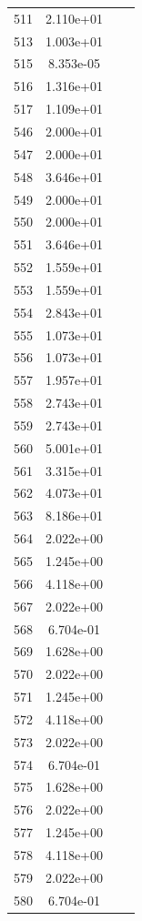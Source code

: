 \documentclass[12pt]{article}
\begin{document}
\begin{longtable}{@{}cccc@{}}
511 & 2.110e+01 &  &  \\
513 & 1.003e+01 &  &  \\
515 & 8.353e-05 &  &  \\
516 & 1.316e+01 &  &  \\
517 & 1.109e+01 &  &  \\
546 & 2.000e+01 &  &  \\
547 & 2.000e+01 &  &  \\
548 & 3.646e+01 &  &  \\
549 & 2.000e+01 &  &  \\
550 & 2.000e+01 &  &  \\
551 & 3.646e+01 &  &  \\
552 & 1.559e+01 &  &  \\
553 & 1.559e+01 &  &  \\
554 & 2.843e+01 &  &  \\
555 & 1.073e+01 &  &  \\
556 & 1.073e+01 &  &  \\
557 & 1.957e+01 &  &  \\
558 & 2.743e+01 &  &  \\
559 & 2.743e+01 &  &  \\
560 & 5.001e+01 &  &  \\
561 & 3.315e+01 &  &  \\
562 & 4.073e+01 &  &  \\
563 & 8.186e+01 &  &  \\
564 & 2.022e+00 &  &  \\
565 & 1.245e+00 &  &  \\
566 & 4.118e+00 &  &  \\
567 & 2.022e+00 &  &  \\
568 & 6.704e-01 &  &  \\
569 & 1.628e+00 &  &  \\
570 & 2.022e+00 &  &  \\
571 & 1.245e+00 &  &  \\
572 & 4.118e+00 &  &  \\
573 & 2.022e+00 &  &  \\
574 & 6.704e-01 &  &  \\
575 & 1.628e+00 &  &  \\
576 & 2.022e+00 &  &  \\
577 & 1.245e+00 &  &  \\
578 & 4.118e+00 &  &  \\
579 & 2.022e+00 &  &  \\
580 & 6.704e-01 &  &  \\

\end{longtable}
\end{document}
